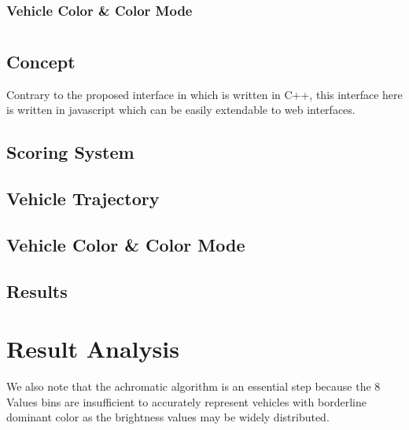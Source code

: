 \subsubsection{Vehicle Color \& Color Mode}



\section{\versionTwo}

\subsection{Concept}

Contrary to the proposed interface in \versionOne which is written in C++, this interface here is written in javascript which can be easily extendable to web interfaces.

\subsection{Scoring System}
\subsection{Vehicle Trajectory}
\subsection{Vehicle Color \& Color Mode}
\subsection{Results}

\section{Result Analysis}
We also note that the achromatic algorithm is an essential step because the 8 Values bins are insufficient to accurately represent vehicles with borderline dominant color as the brightness values may be widely distributed.





